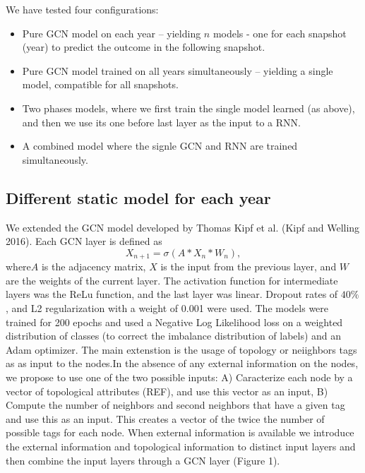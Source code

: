 We have tested four configurations:

\begin{itemize}
\item	Pure GCN  model on each year – yielding $n$ models - one for each snapshot (year) to predict the outcome in the following snapshot.
\item	Pure GCN model trained on all years simultaneously – yielding a single model, compatible for all snapshots.
\item	Two phases models, where  we first train the single model learned (as above), and then we use its one before last layer as the input to  a RNN.
\item 	A combined model  where the signle GCN and RNN  are trained simultaneously.
\end{itemize}
\subsection {Different static model for each year}
We extended the GCN model developed by Thomas Kipf et al. (Kipf and Welling 2016). Each GCN layer is defined as 
$$X_{n+1}=\sigma(A*X_n*W_n ),$$
where$ A$ is the adjacency matrix, $X$  is the input from the previous layer, and $W$ are the weights of the current layer.  The activation function for intermediate layers was the ReLu function, and the last layer was linear. Dropout rates of $40 \%$, and L2 regularization with a weight of 0.001 were used. The models were trained for 200 epochs and used a Negative Log Likelihood loss on a weighted distribution of classes (to correct the imbalance distribution of labels) and an Adam optimizer. The main extenstion is the usage of topology or neiighbors tags as as input to the nodes.In the absence of any external information on the nodes, we propose to use one of the two possible inputs: A) Caracterize each node by a vector of topological attributes (REF), and use this vector as an input, B) Compute the number of neighbors and second neighbors that have a given tag and use this as an input. This creates a vector of the twice the number of possible tags for each node. When external information is available we introduce the external information and topological information to distinct input layers and then combine the input layers through a GCN layer (Figure 1). 


